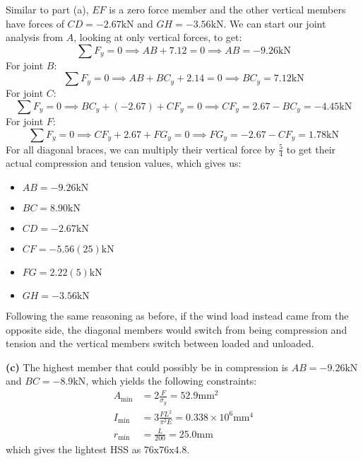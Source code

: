 \documentclass{article}
\begin{document}
Similar to part (a), $EF$ is a zero force member and the other vertical members have forces of $CD=-2.67\si{\kilo\newton}$ and $GH=-3.56\si{\kilo\newton}$. We can start our joint analysis from $A$, looking at only vertical forces, to get:
\begin{equation}
    \sum F_y = 0 \implies AB+7.12=0 \implies AB=-9.26\si{\kilo\newton}
    \label{eq:}
\end{equation}
For joint $B$:
\begin{equation}
    \sum F_y = 0 \implies AB+BC_y+2.14 = 0 \implies BC_y = 7.12\si{\kilo\newton}
    \label{eq:}
\end{equation}
For joint $C$:
\begin{equation}
    \sum F_y = 0 \implies BC_y+(-2.67)+CF_y = 0 \implies CF_y = 2.67-BC_y=-4.45\si{\kilo\newton}
    \label{eq:}
\end{equation}
For joint $F$:
\begin{equation}
    \sum F_y = 0 \implies CF_y + 2.67 + FG_y =0 \implies FG_y = -2.67-CF_y=1.78\si{\kilo\newton}
    \label{eq:}
\end{equation}
For all diagonal braces, we can multiply their vertical force by $\frac{5}{4}$ to get their actual compression and tension values, which gives us:
\begin{itemize}
    \item $AB=-9.26\si{\kilo\newton}$
    \item $BC=8.90\si{\kilo\newton}$
    \item $CD=-2.67\si{\kilo\newton}$
    \item $CF=-5.56(25)\si{\kilo\newton}$
    \item $FG=2.22(5) \si{\kilo\newton}$
    \item $GH=-3.56\si{\kilo\newton}$
\end{itemize}
Following the same reasoning as before, if the wind load instead came from the opposite side, the diagonal members would switch from being compression and tension and the vertical members switch between loaded and unloaded.

\textbf{(c)} The highest member that could possibly be in compression is $AB=-9.26\si{\kilo\newton}$ and $BC=-8.9\si{\kilo\newton}$, which yields the following constraints:
\begin{align}
    A_\text{min} &= 2\frac{F}{\sigma_y} = 52.9 \si{\milli\meter\squared}\\ 
    I_\text{min} &= 3\frac{FL^2}{\pi^2 E} = 0.338 \times 10^6 \si{\milli\meter\tothe{4}}\\ 
    r_\text{min} &= \frac{L}{200}  = 25.0\si{\milli\meter}
\end{align}
which gives the lightest HSS as $\boxed{\text{76x76x4.8}}$.
\newpage
\end{document}
